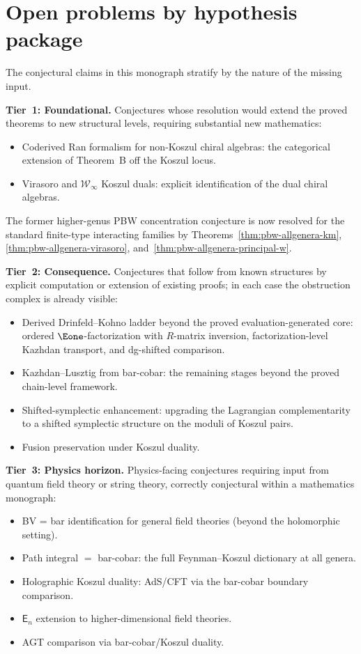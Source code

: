 \section{Open problems by hypothesis package}
\label{sec:conjecture-stratification}

The conjectural claims in this monograph stratify by the nature of the
missing input.

\smallskip\noindent\textbf{Tier~1: Foundational.}
Conjectures whose resolution would extend the proved theorems
to new structural levels, requiring substantial new mathematics:
\begin{itemize}
\item Coderived Ran formalism for non-Koszul chiral algebras:
 the categorical extension of Theorem~B off the Koszul locus.
\item Virasoro and $\mathcal{W}_{\infty}$ Koszul duals: explicit
 identification of the dual chiral algebras.
\end{itemize}

\smallskip
\noindent
The former higher-genus PBW concentration conjecture is now resolved
for the standard finite-type interacting families by
Theorems~\ref{thm:pbw-allgenera-km},
\ref{thm:pbw-allgenera-virasoro},
and~\ref{thm:pbw-allgenera-principal-w}.

\smallskip\noindent\textbf{Tier~2: Consequence.}
Conjectures that follow from known structures by explicit
computation or extension of existing proofs; in each case the
obstruction complex is already visible:
\begin{itemize}
\item Derived Drinfeld--Kohno ladder beyond the proved
 evaluation-generated core:
 ordered $\Eone$-factorization with $R$-matrix inversion,
 factorization-level Kazhdan transport, and dg-shifted comparison.
\item Kazhdan--Lusztig from bar-cobar: the remaining stages
 beyond the proved chain-level framework.
\item Shifted-symplectic enhancement: upgrading the Lagrangian
 complementarity to a shifted symplectic structure on the
 moduli of Koszul pairs.
\item Fusion preservation under Koszul duality.
\end{itemize}

\smallskip\noindent\textbf{Tier~3: Physics horizon.}
Physics-facing conjectures requiring input from quantum field
theory or string theory, correctly conjectural within
a mathematics monograph:
\begin{itemize}
\item BV = bar identification for general field theories
 (beyond the holomorphic setting).
\item Path integral $=$ bar-cobar: the full Feynman--Koszul
 dictionary at all genera.
\item Holographic Koszul duality: AdS/CFT via the bar-cobar
 boundary comparison.
\item $\mathsf{E}_n$ extension to higher-dimensional field theories.
\item AGT comparison via bar-cobar/Koszul duality.
\end{itemize}


